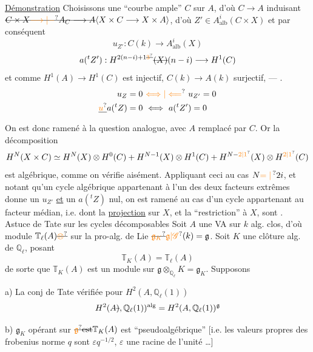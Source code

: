 \uline{Démonstration} Choisissons une ``courbe ample''
$C$ sur $A$,  d'où $C\longrightarrow A$ induisant
$\deleted{C\times X\unsure{\longrightarrow|-} A_C\longrightarrow A}\inserted{X\times C\longrightarrow X\times A}$, d'où $Z'\in A^i_{\mathrm{alb}}(C\times X)$ et
par conséquent
\[
u_{Z'}:C(k)\longrightarrow A^i_{\mathrm{alb}}(X)
\]
\[
a({}^t Z'):H^{2(n-i)+1\deleted{\unsure{3}}}\deleted{(X)}(n-i)\longrightarrow H^1(C)
\]
et comme $H^1(A)\longrightarrow H^1(C)$ est injectif, $C(k)\longrightarrow A(k)$
surjectif, --- .
\[
\begin{aligned}
u_Z=0&\ \unsure{\Longleftrightarrow|\Longleftarrow}\ u_{Z'}=0\\
\deleted{\unsure{u}}a({}^t Z)=0&\ \Longleftrightarrow\ a({}^t Z')=0
\end{aligned}
\]
On est donc ramené à la question analogue,
avec $A$ remplacé par $C$. Or  la décomposition
\[
H^N(X\times C)\simeq H^N(X)\otimes H^0(C)+H^{N-1}(X)\otimes H^1(C)+H^{N-\unsure{2|1}}(X)\otimes H^{\unsure{2|1}}(C)
\]
est algébrique, comme  on vérifie aisément.
Appliquant ceci au cas $N\unsure{=|\,}2i$, et notant
qu'un cycle algébrique appartenant à l'un des
deux facteurs extrêmes donne un $u_{Z'}$ \uline{et}
un $a({}^t Z)$ nul, on est ramené au
cas d'un cycle appartenant au facteur
médian, i.e. dont la \uline{projection} sur $X$, et
la ``restriction'' à $X$, sont .
Astuce de Tate sur les cycles décomposables
Soit $A$ une VA sur $k$ alg. clos,
d'où module $\mathbb T_\ell(A)\deleted{\unsure{\otimes}}$ sur la pro-alg. de Lie $\deleted{\unsure{\mathfrak g_K}}\unsure{\mathfrak g|\mathscr G}(k)=\mathfrak g$.
Soit $K$ une clôture alg. de $\mathbb Q_\ell$, posant
\[
\mathbb T_{K}(A)=\mathbb T_\ell(A)
\]
de sorte que $\mathbb T_K(A)$ est un module sur
$\mathfrak g\otimes_{\mathbb Q_\ell}K=\mathfrak g_K$. Supposons

a) La  conj de Tate vérifiée pour $H^2(A,\mathbb Q_\ell(1))$
\[
H^2(A\deleted{)},\mathbb Q_\ell(1))^{\mathrm{alg}}=H^2(A,\mathbb Q_\ell(1))^{\mathfrak g}
\]

b) $\mathfrak g_K$ opérant sur $\deleted{\unsure{\mathfrak g}}\deleted{\text{est}}\mathbb T_K(A)$ est ``pseudoalgébrique''
[i.e. les valeurs propres des frobenius  
norme $q$ sont $\varepsilon q^{-1/2}$, $\varepsilon$ une racine de l'unité \ldots]

